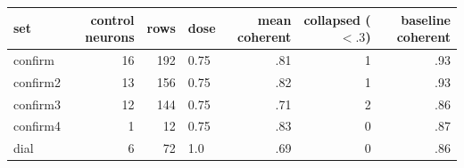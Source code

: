 \begin{tabular}{lrrlrrr}\toprule
set & control neurons & rows & dose & mean coherent & collapsed ($<.3$) & baseline coherent\\\midrule
confirm & 16 & 192 & 0.75 & .81 & 1 & .93\\
confirm2 & 13 & 156 & 0.75 & .82 & 1 & .93\\
confirm3 & 12 & 144 & 0.75 & .71 & 2 & .86\\
confirm4 & 1 & 12 & 0.75 & .83 & 0 & .87\\
dial & 6 & 72 & 1.0 & .69 & 0 & .86\\
\bottomrule\end{tabular}
